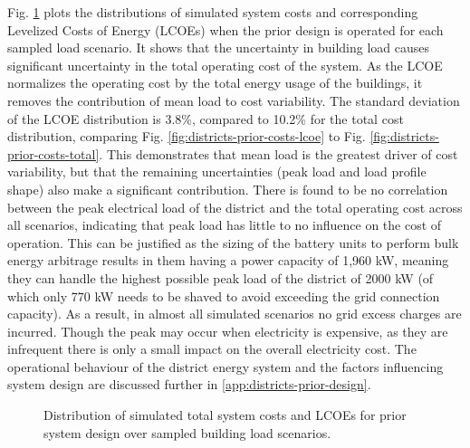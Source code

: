 Fig. \ref{fig:districts-prior-costs} plots the distributions of simulated system costs and corresponding Levelized Costs of Energy (LCOEs) when the prior design is operated for each sampled load scenario. It shows that the uncertainty in building load causes significant uncertainty in the total operating cost of the system. As the LCOE normalizes the operating cost by the total energy usage of the buildings, it removes the contribution of mean load to cost variability. The standard deviation of the LCOE distribution is 3.8\%, compared to 10.2\% for the total cost distribution, comparing Fig. \ref{fig:districts-prior-costs-lcoe} to Fig. \ref{fig:districts-prior-costs-total}. This demonstrates that mean load is the greatest driver of cost variability, but that the remaining uncertainties (peak load and load profile shape) also make a significant contribution.
There is found to be no correlation between the peak electrical load of the district and the total operating cost across all scenarios, indicating that peak load has little to no influence on the cost of operation. This can be justified as the sizing of the battery units to perform bulk energy arbitrage results in them having a power capacity of 1,960 kW, meaning they can handle the highest possible peak load of the district of 2000 kW (of which only 770 kW needs to be shaved to avoid exceeding the grid connection capacity). As a result, in almost all simulated scenarios no grid excess charges are incurred. Though the peak may occur when electricity is expensive, as they are infrequent there is only a small impact on the overall electricity cost. The operational behaviour of the district energy system and the factors influencing system design are discussed further in \ref{app:districts-prior-design}.

\begin{figure}
    \centering
    \hfill
    \vspace*{-0.2cm}
    \caption{Distribution of simulated total system costs and LCOEs for prior system design over sampled building load scenarios.} \label{fig:districts-prior-costs}
\end{figure}

